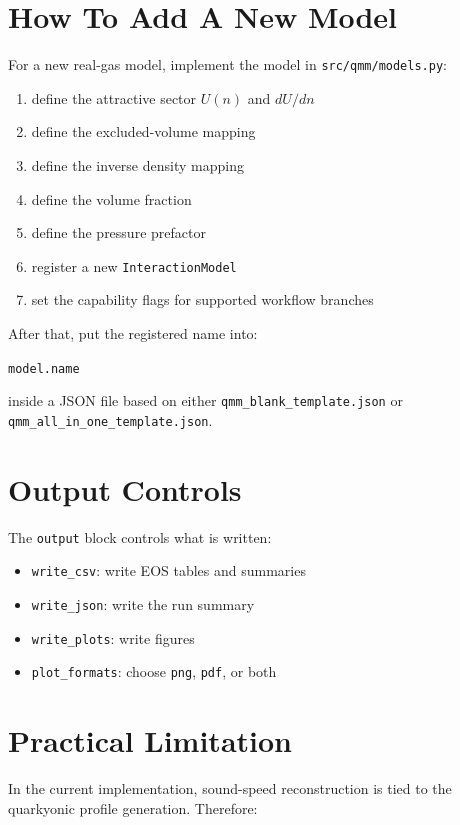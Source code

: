 \documentclass[11pt]{article}
\begin{document}
\section{How To Add A New Model}

For a new real-gas model, implement the model in \texttt{src/qmm/models.py}:

\begin{enumerate}
\item define the attractive sector $U(n)$ and $dU/dn$
\item define the excluded-volume mapping
\item define the inverse density mapping
\item define the volume fraction
\item define the pressure prefactor
\item register a new \texttt{InteractionModel}
\item set the capability flags for supported workflow branches
\end{enumerate}

After that, put the registered name into:
\begin{center}
\texttt{model.name}
\end{center}

inside a JSON file based on either \texttt{qmm\_blank\_template.json} or
\texttt{qmm\_all\_in\_one\_template.json}.

\section{Output Controls}

The \texttt{output} block controls what is written:

\begin{itemize}
\item \texttt{write\_csv}: write EOS tables and summaries
\item \texttt{write\_json}: write the run summary
\item \texttt{write\_plots}: write figures
\item \texttt{plot\_formats}: choose \texttt{png}, \texttt{pdf}, or both
\end{itemize}

\section{Practical Limitation}

In the current implementation, sound-speed reconstruction is tied to the
quarkyonic profile generation.  Therefore:
\end{document}
